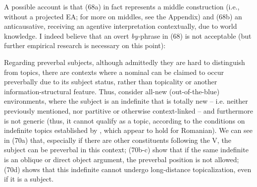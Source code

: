 \documentclass[output=paper]{langsci/langscibook}
\begin{document}
A possible account is that (68a) in fact represents a middle construction (i.e., without a projected EA; for more on middles, see the Appendix) and (68b) an anticausative, receiving an agentive interpretation contextually, due to world knowledge. I indeed believe that an overt \textit{by-}phrase in (68) is not acceptable (but further empirical research is necessary on this point):

    \z

Regarding preverbal subjects, although admittedly they are hard to distinguish from topics, there are contexts where a nominal can be claimed to occur preverbally due to its subject status, rather than topicality or another information-structural feature. Thus, consider all-new (out-of-the-blue) environments, where the subject is an indefinite that is totally new – i.e. neither previously mentioned, nor partitive or otherwise context-linked – and furthermore is not generic (thus, it cannot qualify as a topic, according to the conditions on indefinite topics established by \citealt{Erteschik-Shir2007}, which appear to hold for Romanian). We can see in (70a) that, especially if there are other constituents following the V, the subject can be preverbal in this context; (70b-c) show that if the same indefinite is an oblique or direct object argument, the preverbal position is not allowed; (70d) shows that this indefinite cannot undergo long-distance topicalization, even if it is a subject.
\end{document}
